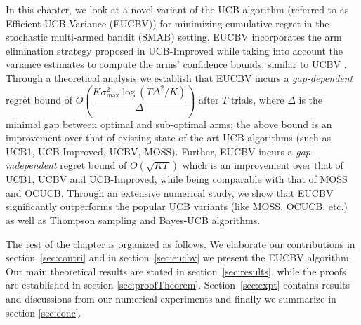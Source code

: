 In this chapter, we look at a novel variant of the UCB algorithm (referred to as Efficient-UCB-Variance (EUCBV)) for minimizing cumulative regret in the stochastic multi-armed bandit (SMAB) setting. EUCBV incorporates the arm elimination strategy proposed in UCB-Improved \citep{auer2010ucb} while taking into account the variance estimates to compute the arms' confidence bounds, similar to UCBV \citep{audibert2009exploration}. Through a theoretical analysis we establish that EUCBV incurs a \emph{gap-dependent} regret bound of {$O\left( \dfrac{K\sigma^2_{\max} \log (T\Delta^2 /K)}{\Delta}\right)$} after $T$ trials, where $\Delta$ is the minimal gap between optimal and sub-optimal arms; the above bound is an improvement over that of existing state-of-the-art UCB algorithms (such as UCB1, UCB-Improved, UCBV,  MOSS). Further, EUCBV incurs a \emph{gap-independent} regret bound of {$O\left(\sqrt{KT}\right)$}  which is an improvement over that of UCB1, UCBV and UCB-Improved, while being comparable with that of MOSS and OCUCB. Through an extensive numerical study, we show that EUCBV significantly outperforms the popular UCB variants (like MOSS, OCUCB, etc.) as well as Thompson sampling and Bayes-UCB algorithms. 

    The rest of the chapter is organized as follows. We elaborate our contributions in section~\ref{sec:contri} and in section~\ref{sec:eucbv} we present the  EUCBV algorithm. Our main theoretical results are stated in section~\ref{sec:results}, while the proofs are established in section \ref{sec:proofTheorem}. Section~\ref{sec:expt} contains results and discussions from our numerical experiments and finally we summarize in section \ref{sec:conc}.
    
